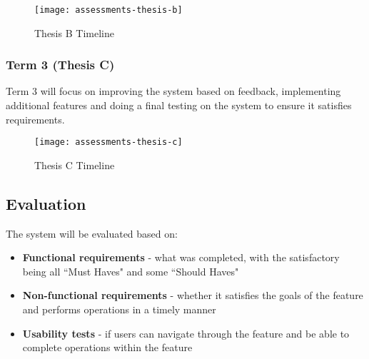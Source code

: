 \begin{figure}[!hbpt]
	\centering
	\texttt{[image: assessments-thesis-b]}
	\caption{Thesis B Timeline}
\end{figure}

\subsubsection{Term 3 (Thesis C)}
Term 3 will focus on improving the system based on feedback, implementing additional features and doing a final testing on the system to ensure it satisfies requirements.

\begin{figure}[!hbpt]
	\centering
	\texttt{[image: assessments-thesis-c]}
	\caption{Thesis C Timeline}
\end{figure}


\subsection{Evaluation}
The system will be evaluated based on:
\begin{itemize}
	\item \textbf{Functional requirements} - what was completed, with the satisfactory being all ``Must Haves" and some ``Should Haves"
	\item \textbf{Non-functional requirements} - whether it satisfies the goals of the feature and performs operations in a timely manner
	\item \textbf{Usability tests} - if users can navigate through the feature and be able to complete operations within the feature
\end{itemize}


\newpage